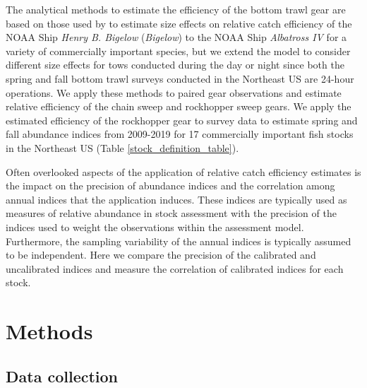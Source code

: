 \documentclass[
  12pt,
]{article}
\begin{document}
The analytical methods to estimate the efficiency of the bottom trawl
gear are based on those used by \citet{miller13} to estimate size
effects on relative catch efficiency of the NOAA Ship \emph{Henry B.
Bigelow} (\emph{Bigelow}) to the NOAA Ship \emph{Albatross IV} for a
variety of commercially important species, but we extend the model to
consider different size effects for tows conducted during the day or
night since both the spring and fall bottom trawl surveys conducted in
the Northeast US are 24-hour operations. We apply these methods to
paired gear observations and estimate relative efficiency of the chain
sweep and rockhopper sweep gears. We apply the estimated efficiency of
the rockhopper gear to survey data to estimate spring and fall abundance
indices from 2009-2019 for 17 commercially important fish stocks in the
Northeast US (Table \ref{stock_definition_table}).

Often overlooked aspects of the application of relative catch efficiency
estimates is the impact on the precision of abundance indices and the
correlation among annual indices that the application induces. These
indices are typically used as measures of relative abundance in stock
assessment with the precision of the indices used to weight the
observations within the assessment model. Furthermore, the sampling
variability of the annual indices is typically assumed to be
independent. Here we compare the precision of the calibrated and
uncalibrated indices and measure the correlation of calibrated indices
for each stock.

\hypertarget{methods}{%
\section{Methods}\label{methods}}

\hypertarget{data-collection}{%
\subsection{Data collection}\label{data-collection}}
\end{document}
